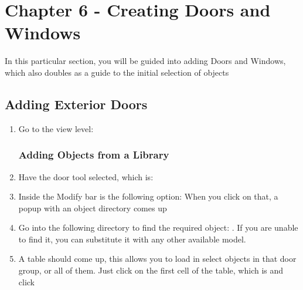 \documentclass{tufte-book} %
\begin{document}
\chapter{Chapter 6 - Creating Doors and Windows}
\label{ch:6}
In this particular section, you will be guided into adding Doors and Windows, which also doubles as a guide to the initial selection of objects
\section{Adding Exterior Doors}
\begin{enumerate}
	\item Go to the view level: 
	
	\subsection{Adding Objects from a Library}
		\item Have the door tool selected, which is: 
		\item Inside the Modify bar is the following option:  When you click on that, a popup with an object directory comes up
		\item Go into the following directory to find the required object: . If you are unable to find it, you can substitute it with any other available model.
		\item A table should come up, this allows you to load in select objects in that door group, or all of them. Just click on the first cell of the table, which is  and click 

\end{enumerate}
\end{document}
